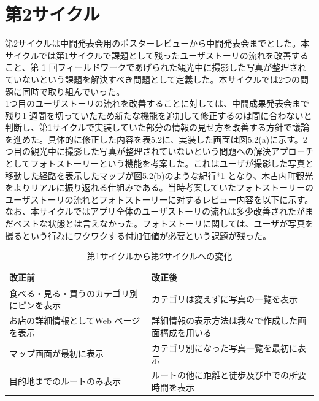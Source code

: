 \section{第2サイクル}
第2サイクルは中間発表会用のポスターレビューから中間発表会までとした。本サイクルでは第1サイクルで課題として残ったユーザストーリの流れを改善すること、第 1 回フィールドワークであげられた観光中に撮影した写真が整理されていないという課題を解決すべき問題として定義した。本サイクルでは2つの問題に同時で取り組んでいった。\\
1つ目のユーザストーリの流れを改善することに対しては、中間成果発表会まで残り1 週間を切っていたため新たな機能を追加して修正するのは間に合わないと判断し、第1サイクルで実装していた部分の情報の見せ方を改善する方針で議論を進めた。具体的に修正した内容を表5.2に、実装した画面は図5.2(a)に示す。2つ目の観光中に撮影した写真が整理されていないという問題への解決アプローチとしてフォトストーリーという機能を考案した。これはユーザが撮影した写真と移動した経路を表示したマップが図5.2(b)のような紀行*1 となり、木古内町観光をよりリアルに振り返れる仕組みである。当時考案していたフォトストーリーのユーザストーリの流れとフォトストーリーに対するレビュー内容を以下に示す。\\なお、本サイクルではアプリ全体のユーザストーリの流れは多少改善されたがまだベストな状態とは言えなかった。フォトストーリに関しては、ユーザが写真を撮るという行為にワクワクする付加価値が必要という課題が残った。

\begin{table}[htb]
\centering
\addtocounter{table}{+1}
\caption{第1サイクルから第2サイクルへの変化}
  \begin{tabular}{|l|l|} \hline
    改正前&改正後  \\ \hline 
    食べる・見る・買うのカテゴリ別にピンを表示 & カテゴリは変えずに写真の一覧を表示 \\  \hline
    お店の詳細情報としてWeb ページを表示 &詳細情報の表示方法は我々で作成した画面構成を用いる\\ \hline
    マップ画面が最初に表示 & カテゴリ別になった写真一覧を最初に表示\\ \hline
    目的地までのルートのみ表示 & ルートの他に距離と徒歩及び車での所要時間を表示 \\ \hline
  \end{tabular} 
\end{table}


